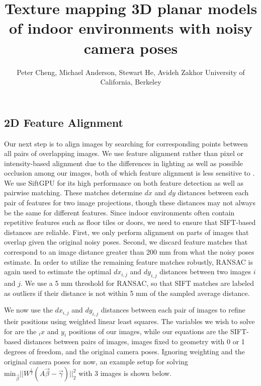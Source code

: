 \documentclass[]{spie}  %
\title{Texture mapping 3D planar models of indoor environments with noisy camera poses}
\author{Peter Cheng, Michael Anderson, Stewart He, Avideh Zakhor
\skiplinehalf
University of California, Berkeley\\
}
\begin{document}
\subsection{2D Feature Alignment}
\label{sec:robustSIFTFeatureMatching}
Our next step is to align images by searching for corresponding points
between all pairs of overlapping images. We use feature alignment
rather than pixel or intensity-based alignment due to the differences
in lighting as well as possible occlusion among our images, both of
which feature alignment is less sensitive to \cite{lowe1999object,
  mikolajczyk2005performance, szeliski2006image}.  We use SiftGPU
\cite{siftgpu} for its high performance on both feature detection as
well as pairwise matching. These matches determine $dx$ and $dy$
distances between each pair of features for two image projections,
though these distances may not always be the same for different
features. Since indoor environments often contain repetitive features
such as floor tiles or doors, we need to ensure that SIFT-based
distances are reliable. First, we only perform alignment on parts of
images that overlap given the original noisy poses. Second, we discard
feature matches that correspond to an image distance greater than 200
mm from what the noisy poses estimate. In order to utilize the
remaining feature matches robustly, RANSAC \cite{fischler1981random}
is again used to estimate the optimal $dx_{i,j}$ and $dy_{i,j}$
distances between two images $i$ and $j$. We use a 5 mm threshold for
RANSAC, so that SIFT matches are labeled as outliers if their distance
is not within 5 mm of the sampled average distance.


We now use the $dx_{i,j}$ and $dy_{i,j}$ distances between each pair
of images to refine their positions using weighted linear least
squares. The variables we wish to solve for are the $_ix$ and $y_i$
positions of our images, while our equations are the SIFT-based
distances between pairs of images, images fixed to geometry with 0 or
1 degrees of freedom, and the original camera poses. Ignoring
weighting and the original camera poses for now, an example setup for
solving $\textrm{min}_{\vec{\beta}} ||W^\frac{1}{2}(A \vec{\beta} -
\vec{\gamma})||_2^2 $ with 3 images is shown below.
\end{document}
